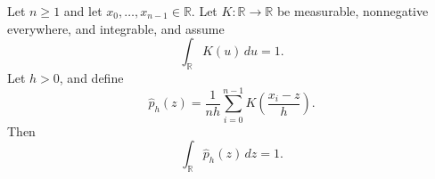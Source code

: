 \begin{theorem}
Let $n\geq1$ and let $x_0,\ldots,x_{n-1}\in\mathbb R$. Let
$K:\mathbb R\to\mathbb R$ be measurable, nonnegative everywhere, and
integrable, and assume
\[
 \int_{\mathbb R}K(u)\,du=1.
\]
Let $h>0$, and define
\[
 \widehat p_h(z)=\frac1{nh}
 \sum_{i=0}^{n-1}K\!\left(\frac{x_i-z}{h}\right).
\]
Then
\[
 \int_{\mathbb R}\widehat p_h(z)\,dz=1.
\]
\end{theorem}

